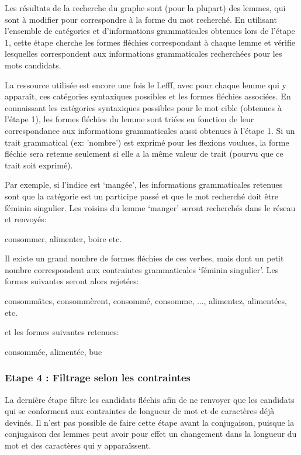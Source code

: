 Les résultats de la recherche du graphe sont (pour la plupart) des lemmes, qui
sont à modifier pour correspondre à la forme du mot recherché. En utilisant 
l'ensemble de catégories et d'informations grammaticales obtenues lors de 
l'étape 1, cette étape cherche les formes fléchies correspondant à chaque 
lemme et vérifie lesquelles correspondent aux informations grammaticales 
recherchées pour les mots candidats.

La ressource utilisée est encore une fois le Lefff, avec pour chaque lemme qui y apparaît, ces catégories syntaxiques possibles et les formes fléchies associées. En connaissant les catégories syntaxiques possibles pour le mot cible (obtenues à l'étape 1), les formes fléchies du lemme sont triées en fonction de leur correspondance aux informations grammaticales aussi obtenues à l'étape 1. Si un trait grammatical (ex: 'nombre') est exprimé pour les flexions voulues, la forme fléchie sera retenue seulement si elle a la même valeur de trait (pourvu que ce trait soit exprimé).

Par exemple, si l'indice est \lq{mangée}\rq{}, les informations grammaticales retenues sont que la catégorie est un participe passé et que le mot recherché doit être féminin singulier. Les voisins du lemme \lq{manger}\rq{} seront recherchés dans le réseau et renvoyés:

\begin{framed}
consommer, alimenter, boire etc.
\end{framed}

Il existe un grand nombre de formes fléchies de ces verbes, mais dont un petit nombre correspondent aux contraintes grammaticales \lq{féminin singulier}\rq{}. Les formes suivantes seront alors rejetées:

\begin{framed}
consommâtes, consommèrent, consommé, consomme, ..., alimentez, alimentées, etc.
\end{framed}

et les formes suivantes retenues:

\begin{framed}
consommée, alimentée, bue
\end{framed}

\subsubsection{Etape 4 : Filtrage selon les contraintes}%

La dernière étape filtre les candidats fléchis afin de ne renvoyer que les candidats qui se conforment aux contraintes de longueur de mot et de caractères déjà devinés. Il n'est pas possible de faire cette étape avant la conjugaison, puisque la conjugaison des lemmes peut avoir pour effet un changement dans la longueur du mot et des caractères qui y apparaîssent.

